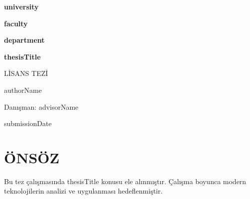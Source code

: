 \documentclass[12pt,a4paper,oneside]{report}
\newcommand{\thesistitle}{ {{thesisTitle}} }
\newcommand{\authorname}{ {{authorName}} }
\newcommand{\advisorname}{ {{advisorName}} }
\newcommand{\university}{ {{university}} }
\newcommand{\faculty}{ {{faculty}} }
\newcommand{\department}{ {{department}} }
\newcommand{\submissiondate}{ {{submissionDate}} }
\begin{document}
\begin{titlepage}
\centering
\vspace*{2cm}

{\fontsize{14}{21}\selectfont\bfseries \university \par}
\vspace{0.5cm}
{\fontsize{14}{21}\selectfont\bfseries \faculty \par}
\vspace{0.5cm}
{\fontsize{14}{21}\selectfont\bfseries \department \par}

\vspace{3cm}

{\fontsize{16}{24}\selectfont\bfseries \thesistitle \par}

\vspace{3cm}

{\fontsize{14}{21}\selectfont LİSANS TEZİ \par}

\vspace{2cm}

{\fontsize{14}{21}\selectfont \authorname \par}

\vspace{2cm}

{\fontsize{12}{18}\selectfont Danışman: \advisorname \par}

\vfill

{\fontsize{12}{18}\selectfont \submissiondate \par}

\end{titlepage}


\chapter*{ÖNSÖZ}

\singlespacing %

Bu tez çalışmasında {{thesisTitle}} konusu ele alınmıştır. Çalışma boyunca modern teknolojilerin analizi ve uygulanması hedeflenmiştir.
\end{document}
